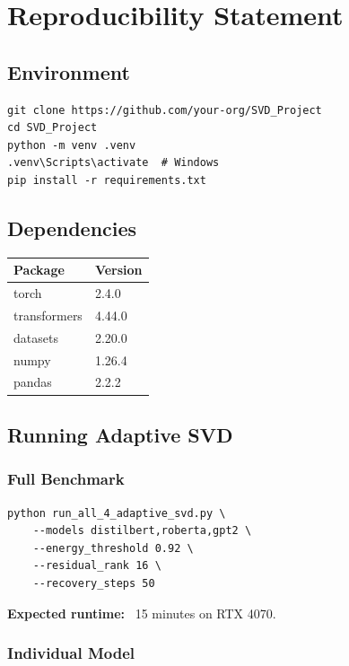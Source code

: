 
\section{Reproducibility Statement}

\subsection{Environment}

\begin{lstlisting}
git clone https://github.com/your-org/SVD_Project
cd SVD_Project
python -m venv .venv
.venv\Scripts\activate  # Windows
pip install -r requirements.txt
\end{lstlisting}

\subsection{Dependencies}

\begin{table}[H]
\centering
\small
\begin{tabular}{ll}
\toprule
\textbf{Package} & \textbf{Version} \\
\midrule
torch & 2.4.0 \\
transformers & 4.44.0 \\
datasets & 2.20.0 \\
numpy & 1.26.4 \\
pandas & 2.2.2 \\
\bottomrule
\end{tabular}
\end{table}

\subsection{Running Adaptive SVD}

\subsubsection{Full Benchmark}

\begin{lstlisting}
python run_all_4_adaptive_svd.py \
    --models distilbert,roberta,gpt2 \
    --energy_threshold 0.92 \
    --residual_rank 16 \
    --recovery_steps 50
\end{lstlisting}

\textbf{Expected runtime:} ~15 minutes on RTX 4070.

\subsubsection{Individual Model}

